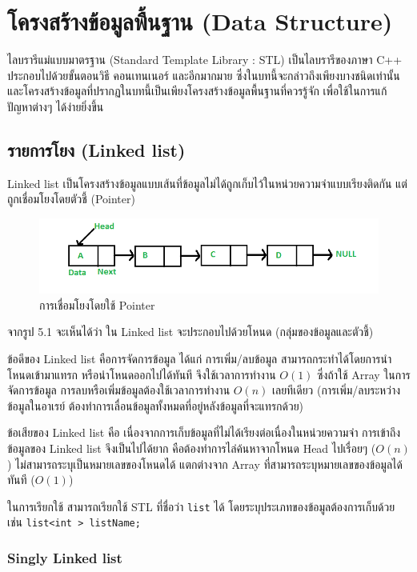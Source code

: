 \chapter{โครงสร้างข้อมูลพื้นฐาน (Data Structure)}

ไลบรารีแม่แบบมาตรฐาน (Standard Template Library : STL) เป็นไลบรารีของภาษา C++ ประกอบไปด้วยขั้นตอนวิธี คอนเทนเนอร์ และอีกมากมาย ซึ่งในบทนี้จะกล่าวถึงเพียงบางชนิดเท่านั้น และโครงสร้างข้อมูลที่ปรากฏในบทนี้เป็นเพียงโครงสร้างข้อมูลพื้นฐานที่ควรรู้จัก เพื่อใช้ในการแก้ปัญหาต่างๆ ได้ง่ายยิ่งขึ้น

\section{รายการโยง (Linked list)}

Linked list เป็นโครงสร้างข้อมูลแบบเส้นที่ข้อมูลไม่ได้ถูกเก็บไว้ในหน่วยความจำแบบเรียงติดกัน แต่ถูกเชื่อมโยงโดยตัวชี้ (Pointer)

\begin{figure}[h!]
    \centering
    \includegraphics[width=13cm]{images/list-pointer}
    \caption{การเชื่อมโยงโดยใช้ Pointer}
    \label{fig:list-pointer}
\end{figure}
จากรูป 5.1 จะเห็นได้ว่า ใน Linked list จะประกอบไปด้วยโหนด (กลุ่มของข้อมูลและตัวชี้)

ข้อดีของ Linked list คือการจัดการข้อมูล ได้แก่ การเพิ่ม/ลบข้อมูล สามารถกระทำได้โดยการนำโหนดเข้ามาแทรก หรือนำโหนดออกไปได้ทันที จึงใช้เวลาการทำงาน $O(1)$ ซึ่งถ้าใช้ Array ในการจัดการข้อมูล การลบหรือเพิ่มข้อมูลต้องใช้เวลาการทำงาน $O(n)$ เลยทีเดียว (การเพิ่ม/ลบระหว่างข้อมูลในอาเรย์ ต้องทำการเลื่อนข้อมูลทั้งหมดที่อยู่หลังข้อมูลที่จะแทรกด้วย)

ข้อเสียของ  Linked list คือ เนื่องจากการเก็บข้อมูลที่ไม่ได้เรียงต่อเนื่องในหน่วยความจำ การเข้าถึงข้อมูลของ Linked list จึงเป็นไปได้ยาก คือต้องทำการไล่ค้นหาจากโหนด Head ไปเรื่อยๆ ($O(n)$) ไม่สามารถระบุเป็นหมายเลขของโหนดได้ แตกต่างจาก Array ที่สามารถระบุหมายเลขของข้อมูลได้ทันที ($O(1)$)

ในการเรียกใช้ สามารถเรียกใช้ STL ที่ชื่อว่า \texttt{list} ได้ โดยระบุประเภทของข้อมูลต้องการเก็บด้วย เช่น \texttt{list<int > listName;}

\subsection{Singly Linked list}

